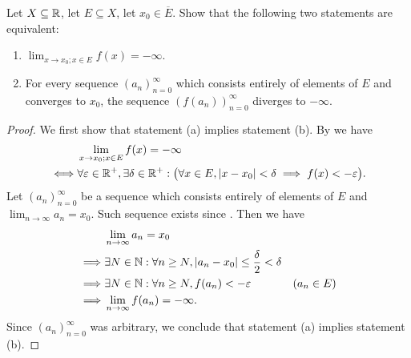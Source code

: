 \begin{ac}\label{i:ac:9.5.4}
  Let \(X \subseteq \mathbb{R}\), let \(E \subseteq X\), let \(x_0 \in \overline{E}\).
  Show that the following two statements are equivalent:
  \begin{enumerate}
    \item \(\lim_{x \to x_0 ; x \in E} f(x) = -\infty\).
    \item For every sequence \((a_n)_{n = 0}^\infty\) which consists entirely of elements of \(E\) and converges to \(x_0\), the sequence \((f(a_n))_{n = 0}^\infty\) diverges to \(-\infty\).
  \end{enumerate}
\end{ac}

\begin{proof}
  We first show that statement (a) implies statement (b).
  By  we have
  \begin{align*}
         & \lim_{x \to x_0 ; x \in E} f(x) = -\infty                                                                                               \\
    \iff & \forall \varepsilon \in \mathbb{R}^+, \exists \delta \in \mathbb{R}^+ : \big(\forall x \in E, \left\lvert x - x_0\right\rvert < \delta \implies f(x) < -\varepsilon\big).
  \end{align*}
  Let \((a_n)_{n = 0}^\infty\) be a sequence which consists entirely of elements of \(E\) and \(\lim_{n \to \infty} a_n = x_0\).
  Such sequence exists since .
  Then we have
  \begin{align*}
             & \lim_{n \to \infty} a_n = x_0                                                                      \\
    \implies & \exists N \in \mathbb{N} : \forall n \geq N, \left\lvert a_n - x_0\right\rvert \leq \dfrac{\delta}{2} < \delta               \\
    \implies & \exists N \in \mathbb{N} : \forall n \geq N, f(a_n) < -\varepsilon                           & (a_n \in E) \\
    \implies & \lim_{n \to \infty} f(a_n) = -\infty.
  \end{align*}
  Since \((a_n)_{n = 0}^\infty\) was arbitrary, we conclude that statement (a) implies statement (b).


\end{proof}
